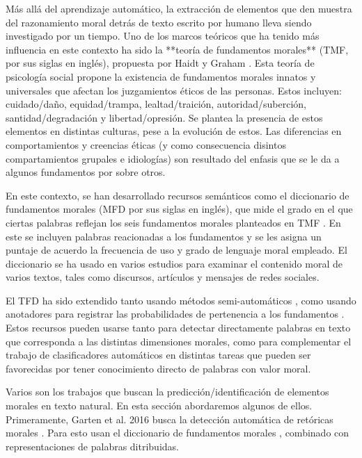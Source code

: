 \documentclass[
	spanish, %
	letterpaper, oneside
]{article}
\begin{document}

Más allá del aprendizaje automático, la extracción de elementos que den muestra del razonamiento moral detrás de texto escrito por humano lleva siendo investigado por un tiempo. Uno de los marcos teóricos que ha tenido más influencia en este contexto ha sido la **teoría de fundamentos morales** (TMF, por sus siglas en inglés), propuesta por Haidt y Graham \cite{mtf,mtf2}. Esta teoría de psicología social propone la existencia de fundamentos morales innatos y universales que afectan los juzgamientos éticos de las personas. Estos incluyen: cuidado/daño, equidad/trampa, lealtad/traición, autoridad/suberción, santidad/degradación y libertad/opresión. Se plantea la presencia de estos elementos en distintas culturas, pese a la evolución de estos. Las diferencias en comportamientos y creencias éticas (y como consecuencia disintos compartamientos grupales e idiologías) son resultado del enfasis que se le da a algunos fundamentos por sobre otros.

\newp En este contexto, se han desarrollado recursos semánticos como el diccionario de fundamentos morales (MFD por sus siglas en inglés), que mide el grado en el que ciertas palabras reflejan los seis fundamentos morales planteados en TMF \cite{tfd}. En este se incluyen palabras reacionadas a los fundamentos y se les asigna un puntaje de acuerdo  la frecuencia de uso y grado de lenguaje moral empleado. El diccionario se ha usado en varios estudios para examinar el contenido moral de varios textos, tales como discursos, artículos y mensajes de redes sociales. 

\newp El TFD ha sido extendido tanto usando métodos semi-automáticos \cite{tfde}, como usando anotadores para registrar las probabilidades de pertenencia a los fundamentos \cite{etfd}. Estos recursos pueden usarse tanto para detectar directamente palabras en texto que corresponda a las distintas dimensiones morales, como para complementar el trabajo de clasificadores automáticos en distintas tareas que pueden ser favorecidas por tener conocimiento directo de palabras con valor moral.



Varios son los trabajos que buscan la predicción/identificación de elementos morales en texto natural. En esta sección abordaremos algunos de ellos. Primeramente, Garten et al. 2016 busca la detección automática de retóricas morales \cite{garten}. Para esto usan el diccionario de fundamentos morales \cite{tfd}, combinado con representaciones de palabras ditribuidas.
\end{document}
